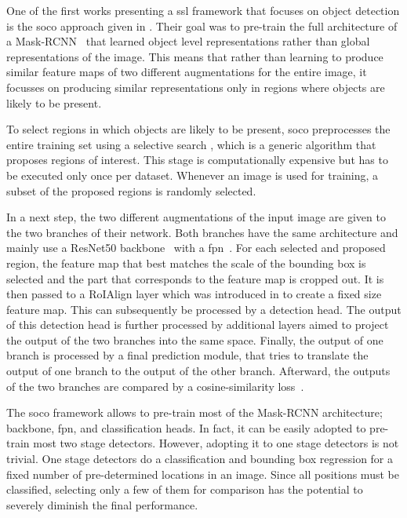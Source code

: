 One of the first works presenting a \acrshort{ssl} framework that focuses on object detection is the \acrshort{soco} approach given in \cite{Wei:2021aaa}. Their goal was to pre-train the full architecture of a Mask-RCNN~\cite{He:2017aaa} that learned object level representations rather than global representations of the image. This means that rather than learning to produce similar feature maps of two different augmentations for the entire image, it focusses on producing similar representations only in regions where objects are likely to be present.

To select regions in which objects are likely to be present, \acrshort{soco} preprocesses the entire training set using a selective search \cite{Uijlings:2013aaa}, which is a generic algorithm that proposes regions of interest. This stage is computationally expensive but has to be executed only once per dataset. Whenever an image is used for training, a subset of the proposed regions is randomly selected.

In a next step, the two different augmentations of the input image are given to the two branches of their network. Both branches have the same architecture and mainly use a ResNet50 backbone~\cite{He:2015aaa} with a \acrshort{fpn}~\cite{Qiao:2021aaa}. For each selected and proposed region, the feature map that best matches the scale of the bounding box is selected and the part that corresponds to the feature map is cropped out. It is then passed to a RoIAlign layer which was introduced in\cite{He:2017aaa} to create a fixed size feature map. This can subsequently be processed by a detection head. The output of this detection head is further processed by additional layers aimed to project the output of the two branches into the same space. Finally, the output of one branch is processed by a final prediction module, that tries to translate the output of one branch to the output of the other branch. Afterward, the outputs of the two branches are compared by a cosine-similarity loss~\cite{Wei:2021aaa}.

The \acrshort{soco} framework allows to pre-train most of the Mask-RCNN architecture; backbone, \acrshort{fpn}, and classification heads. In fact, it can be easily adopted to pre-train most two stage detectors. However, adopting it to one stage detectors is not trivial. One stage detectors do a classification and bounding box regression for a fixed number of pre-determined locations in an image. Since all positions must be classified, selecting only a few of them for comparison has the potential to severely diminish the final performance.


